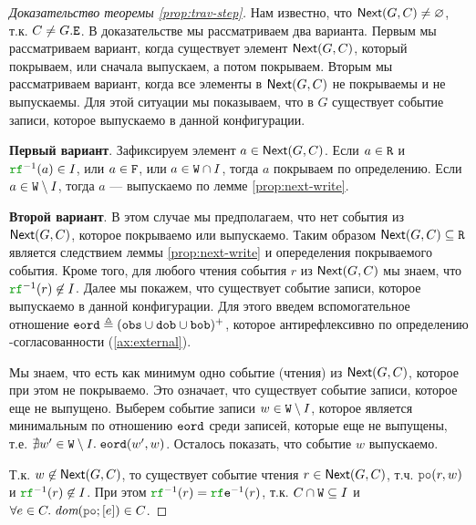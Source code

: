\begin{proof}[Доказательство теоремы \ref{prop:trav-step}]
  Нам известно, что ${\sf Next}(G, C) \neq \varnothing$, т.к. $C \neq G.{\mathtt{E}}$.
  В доказательстве мы рассматриваем два варианта. Первым мы рассматриваем вариант, когда существует
  элемент ${\sf Next}(G, C)$, который покрываем, или сначала выпускаем, а потом покрываем. 
  Вторым мы рассматриваем вариант, когда все элементы в ${\sf Next}(G, C)$ не покрываемы и не выпускаемы.
  Для этой ситуации мы показываем, что в $G$ существует событие записи, которое выпускаемо в данной конфигурации.

  {\bf Первый вариант}.
  Зафиксируем элемент $a \in {\sf Next}(G, C)$.
  Если $a \in {\mathtt{R}}$ и $\lRF^{-1}(a) \in \IssuedSet$, или $a \in {\mathtt{F}}$, или $a \in {\mathtt{W}} \cap I$,
  тогда $a$ покрываем по определению.
  Если $a \in {\mathtt{W}} \setminus I$, тогда $a$ --- выпускаемо по лемме \ref{prop:next-write}.

  {\bf Второй вариант}.
  В этом случае мы предполагаем, что нет события из ${\sf Next}(G, C)$, которое покрываемо или выпускаемо.
  Таким образом ${\sf Next}(G, C) \subseteq {\mathtt{R}}$ является следствием леммы \ref{prop:next-write} и опеределения покрываемого события.
  Кроме того, для любого чтения события $r$ из ${\sf Next}(G, C)$ мы знаем, что $\lRF^{-1}(r) \nin \IssuedSet$.
  Далее мы покажем, что существует событие записи, которое выпускаемо в данной конфигурации.
  Для этого введем вспомогательное отношение ${\mathtt{eord}} \triangleq ({\mathtt{obs}} \cup {\mathtt{dob}} \cup {\mathtt{bob}})^{+}$,
  которое антирефлексивно по определению \ARM-согласованности (\ref{ax:external}).
  
  Мы знаем, что есть как минимум одно событие (чтения) из ${\sf Next}(G, C)$, которое при этом не покрываемо.
  Это означает, что существует событие записи, которое еще не выпущено.
  Выберем событие записи $w \in {\mathtt{W}} \setminus I$, которое является минимальным по отношению ${\mathtt{eord}}$ среди записей,
  которые еще не выпущены, т.е. $\nexists w' \in {\mathtt{W}} \setminus I. \; {\mathtt{eord}}(w', w)$.
  Осталось показать, что событие $w$ выпускаемо.
  
  Т.к. $w \not\in {\sf Next}(G, C)$, то существует событие чтения $r \in {\sf Next}(G, C)$, т.ч. $\lPO(r, w)$
  и $\lRF^{-1}(r) \nin \IssuedSet$. При этом $\lRF^{-1}(r) = \lRFE^{-1}(r)$, т.к.
  $C \cap {\mathtt{W}} \subseteq I$ и $\forall e \in C. \; \dom{\lPO; [e]} \in C$.


\end{proof}
